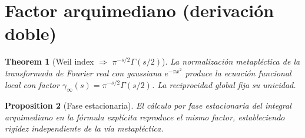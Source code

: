 \section{Factor arquimediano (derivación doble)}

\newtheorem{theoremF}{Theorem}[section]
\newtheorem{propF}[theoremF]{Proposition}

\begin{theoremF}[Weil index $\Rightarrow$ $\pi^{-s/2}\Gamma(s/2)$]
La normalización metapléctica de la transformada de Fourier real con gaussiana
$e^{-\pi x^2}$ produce la ecuación funcional local con factor
$\gamma_\infty(s)=\pi^{-s/2}\Gamma(s/2)$. La reciprocidad global fija su unicidad.
\end{theoremF}

\begin{propF}[Fase estacionaria]
El cálculo por fase estacionaria del integral arquimediano en la fórmula explícita
reproduce el mismo factor, estableciendo rigidez independiente de la vía metapléctica.
\end{propF}
